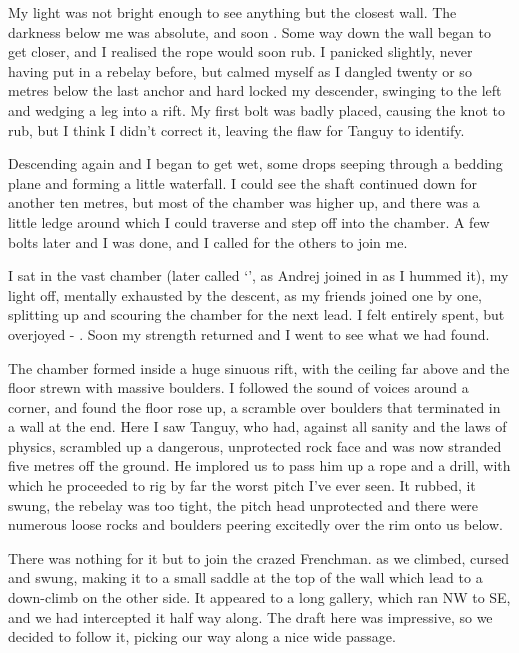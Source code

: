 My light was not bright enough to see anything but the closest wall. The darkness below me was absolute, and soon . Some way down the wall began to get closer, and I realised the rope would soon rub. I panicked slightly, never having put in a rebelay before, but calmed myself as I dangled twenty or so metres below the last anchor and hard locked my descender, swinging to the left and wedging a leg into a rift. My first bolt was badly placed, causing the knot to rub, but I think I didn't correct it, leaving the flaw for Tanguy to identify. 
 
Descending again and I began to get wet, some drops seeping through a bedding plane and forming a little waterfall. I could see the shaft continued down for another ten metres, but most of the chamber was higher up, and there was a little ledge around which I could traverse and step off into the chamber. A few bolts later and I was done, and I called for the others to join me.
 
I sat in the vast chamber (later called `', as Andrej joined in as I hummed it), my light off, mentally exhausted by the descent, as my friends joined one by one, splitting up and scouring the chamber for the next lead. I felt entirely spent, but overjoyed - . Soon my strength returned and I went to see what we had found.
 
The chamber formed inside a huge sinuous rift, with the ceiling far above and the floor strewn with massive boulders. I followed the sound of voices around a corner, and found the floor rose up, a scramble over boulders that terminated in a wall at the end. Here I saw Tanguy, who had, against all sanity and the laws of physics, scrambled up a dangerous, unprotected rock face and was now stranded five metres off the ground. He implored us to pass him up a rope and a drill, with which he proceeded to rig by far the worst pitch I've ever seen. It rubbed, it swung, the rebelay was too tight, the pitch head unprotected and there were numerous loose rocks and boulders peering excitedly over the rim onto us below.


 
There was nothing for it but to join the crazed Frenchman.  as we climbed, cursed and swung, making it to a small saddle at the top of the wall which lead to a down-climb on the other side. It appeared to a long gallery, which ran NW to SE, and we had intercepted it half way along. The draft here was impressive, so we decided to follow it, picking our way along a nice wide passage.
 
